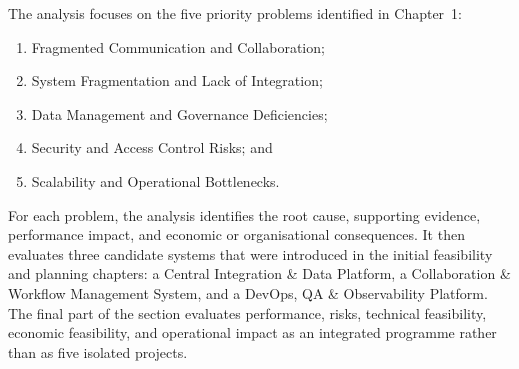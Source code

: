 \documentclass[12pt,a4paper]{report}
\begin{document}
The analysis focuses on the five priority problems identified in Chapter~1:

\begin{enumerate}[label=\arabic*., leftmargin=1.8em]
    \item Fragmented Communication and Collaboration;
    \item System Fragmentation and Lack of Integration;
    \item Data Management and Governance Deficiencies;
    \item Security and Access Control Risks; and
    \item Scalability and Operational Bottlenecks.
\end{enumerate}

For each problem, the analysis identifies the root cause, supporting evidence, performance
impact, and economic or organisational consequences. It then evaluates three candidate
systems that were introduced in the initial feasibility and planning chapters: a Central
Integration \& Data Platform, a Collaboration \& Workflow Management System, and a
DevOps, QA \& Observability Platform. The final part of the section evaluates performance,
risks, technical feasibility, economic feasibility, and operational impact as an integrated
programme rather than as five isolated projects.
\end{document}
